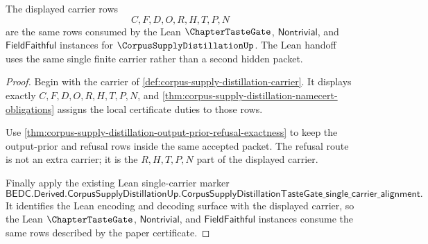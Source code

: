\begin{theorem}
\label{thm:corpus-supply-distillation-lean-tastegate-handoff}
The displayed carrier rows
$$
C,F,D,O,R,H,T,P,N
$$
are the same rows consumed by the Lean $\ChapterTasteGate$, $\mathsf{Nontrivial}$, and $\mathsf{FieldFaithful}$ instances for $\CorpusSupplyDistillationUp$. The Lean handoff uses the same single finite carrier rather than a second hidden packet.
\end{theorem}
\begin{proof}
Begin with the carrier of \autoref{def:corpus-supply-distillation-carrier}. It displays exactly $C,F,D,O,R,H,T,P,N$, and \autoref{thm:corpus-supply-distillation-namecert-obligations} assigns the local certificate duties to those rows.

Use \autoref{thm:corpus-supply-distillation-output-prior-refusal-exactness} to keep the output-prior and refusal rows inside the same accepted packet. The refusal route is not an extra carrier; it is the $R,H,T,P,N$ part of the displayed carrier.

Finally apply the existing Lean single-carrier marker
$$
\mathsf{BEDC.Derived.CorpusSupplyDistillationUp.CorpusSupplyDistillationTasteGate\_single\_carrier\_alignment}.
$$
It identifies the Lean encoding and decoding surface with the displayed carrier, so the Lean $\ChapterTasteGate$, $\mathsf{Nontrivial}$, and $\mathsf{FieldFaithful}$ instances consume the same rows described by the paper certificate.
\end{proof}

